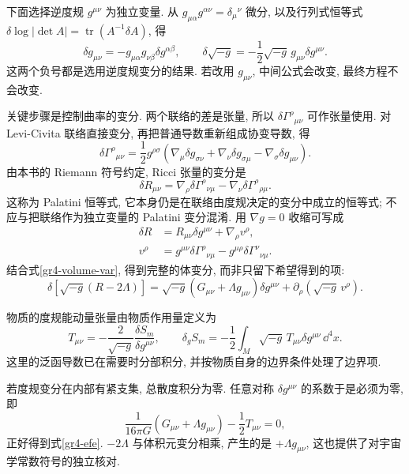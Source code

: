 下面选择逆度规 $g^{\mu\nu}$ 为独立变量. 从 $g_{\mu\alpha}g^{\alpha\nu}=\delta_\mu{}^\nu$ 微分, 以及行列式恒等式 $\delta\log|\det A|=\operatorname{tr}(A^{-1}\delta A)$, 得
\begin{equation}\label{gr4-volume-var}
 \delta g_{\mu\nu}=-g_{\mu\alpha}g_{\nu\beta}\delta g^{\alpha\beta},
 \qquad
 \delta\sqrt{-g}=-\frac12\sqrt{-g}\,g_{\mu\nu}\delta g^{\mu\nu}.
\end{equation}
这两个负号都是选用逆度规变分的结果. 若改用 $g_{\mu\nu}$, 中间公式会改变, 最终方程不会改变.

关键步骤是控制曲率的变分. 两个联络的差是张量, 所以 $\delta\Gamma^\rho{}_{\mu\nu}$ 可作张量使用. 对 Levi-Civita 联络直接变分, 再把普通导数重新组成协变导数, 得
\[
 \delta\Gamma^\rho{}_{\mu\nu}
 =\frac12g^{\rho\sigma}
  (\nabla_\mu\delta g_{\sigma\nu}+\nabla_\nu\delta g_{\sigma\mu}
   -\nabla_\sigma\delta g_{\mu\nu}).
\]
由本书的 Riemann 符号约定, Ricci 张量的变分是
\[
 \delta R_{\mu\nu}
   =\nabla_\rho\delta\Gamma^\rho{}_{\nu\mu}
        -\nabla_\nu\delta\Gamma^\rho{}_{\rho\mu}.
\]
这称为 Palatini 恒等式, 它本身仍是在联络由度规决定的变分中成立的恒等式; 不应与把联络作为独立变量的 Palatini 变分混淆. 用 $\nabla g=0$ 收缩可写成
\begin{align*}
 \delta R&=R_{\mu\nu}\delta g^{\mu\nu}+\nabla_\rho v^\rho,\\
 v^\rho&=g^{\mu\nu}\delta\Gamma^\rho{}_{\nu\mu}
                 -g^{\mu\rho}\delta\Gamma^\nu{}_{\nu\mu}.
\end{align*}
结合式\eqref{gr4-volume-var}, 得到完整的体变分, 而非只留下希望得到的项:
\begin{equation}\label{gr4-action-var}
 \delta[\sqrt{-g}(R-2\Lambda)]
 =\sqrt{-g}(G_{\mu\nu}+\Lambda g_{\mu\nu})\delta g^{\mu\nu}
     +\partial_\rho(\sqrt{-g}\,v^\rho).
\end{equation}

\begin{definition}
物质的度规能动量张量由物质作用量定义为
\[
 T_{\mu\nu}=-\frac2{\sqrt{-g}}\frac{\delta S_m}{\delta g^{\mu\nu}},
 \qquad
 \delta_g S_m=-\frac12\int_M\sqrt{-g}\,T_{\mu\nu}\delta g^{\mu\nu}\,\dd^4x.
\]
这里的泛函导数已在需要时分部积分, 并按物质自身的边界条件处理了边界项.
\end{definition}

若度规变分在内部有紧支集, 总散度积分为零. 任意对称 $\delta g^{\mu\nu}$ 的系数于是必须为零, 即
\[
 \frac1{16\pi G}(G_{\mu\nu}+\Lambda g_{\mu\nu})-\frac12T_{\mu\nu}=0,
\]
正好得到式\eqref{gr4-efe}. $-2\Lambda$ 与体积元变分相乘, 产生的是 $+\Lambda g_{\mu\nu}$, 这也提供了对宇宙学常数符号的独立核对.

